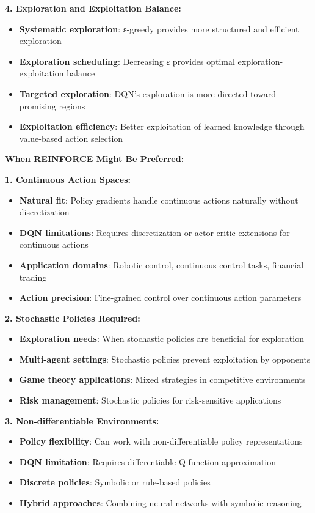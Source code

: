 \documentclass[12pt]{article}
\begin{document}
{{{\textbf{4. Exploration and Exploitation Balance:}
\begin{itemize}
    \item \textbf{Systematic exploration}: ε-greedy provides more structured and efficient exploration
    \item \textbf{Exploration scheduling}: Decreasing ε provides optimal exploration-exploitation balance
    \item \textbf{Targeted exploration}: DQN's exploration is more directed toward promising regions
    \item \textbf{Exploitation efficiency}: Better exploitation of learned knowledge through value-based action selection
\end{itemize}

\textbf{When REINFORCE Might Be Preferred:}

\textbf{1. Continuous Action Spaces:}
\begin{itemize}
    \item \textbf{Natural fit}: Policy gradients handle continuous actions naturally without discretization
    \item \textbf{DQN limitations}: Requires discretization or actor-critic extensions for continuous actions
    \item \textbf{Application domains}: Robotic control, continuous control tasks, financial trading
    \item \textbf{Action precision}: Fine-grained control over continuous action parameters
\end{itemize}

\textbf{2. Stochastic Policies Required:}
\begin{itemize}
    \item \textbf{Exploration needs}: When stochastic policies are beneficial for exploration
    \item \textbf{Multi-agent settings}: Stochastic policies prevent exploitation by opponents
    \item \textbf{Game theory applications}: Mixed strategies in competitive environments
    \item \textbf{Risk management}: Stochastic policies for risk-sensitive applications
\end{itemize}

\textbf{3. Non-differentiable Environments:}
\begin{itemize}
    \item \textbf{Policy flexibility}: Can work with non-differentiable policy representations
    \item \textbf{DQN limitation}: Requires differentiable Q-function approximation
    \item \textbf{Discrete policies}: Symbolic or rule-based policies
    \item \textbf{Hybrid approaches}: Combining neural networks with symbolic reasoning
\end{itemize}

}}}
\end{document}
